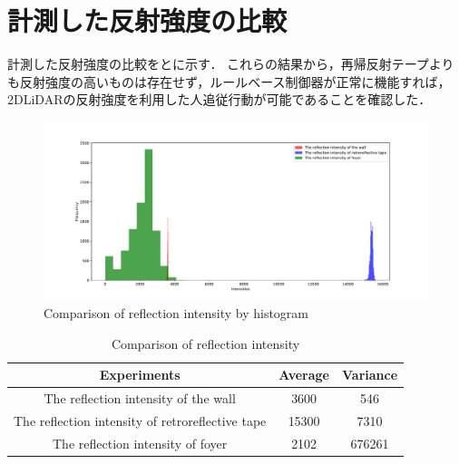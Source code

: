 \section{計測した反射強度の比較}

  計測した反射強度の比較をとに示す．
  これらの結果から，再帰反射テープよりも反射強度の高いものは存在せず，ルールベース制御器が正常に機能すれば，2DLiDARの反射強度を利用した人追従行動が可能であることを確認した．
  \begin{figure}[h]
    \centering
    \includegraphics[width=14cm] {images/pdf/RobotGuidance_plot_reflection_intensities_of_all}
    \captionsetup{justification=raggedright} %
    \caption{Comparison of reflection intensity by histogram}
    \label{Fig:Comparison of reflection intensity by histogram}
  \end{figure}

  \begin{table}[h]
    \caption{Comparison of reflection intensity}
    \label{tab:Comparison of reflection intensity}
    \centering
    \begin{tabular}{ccc}
    \hline
    Experiments                                      & Average & Variance \\
    \hline
    The reflection intensity of the wall             & 3600    & 546      \\
    The reflection intensity of retroreflective tape & 15300   & 7310     \\
    The reflection intensity of foyer                & 2102    & 676261  \\
    \hline
    \end{tabular}
  \end{table}

\newpage